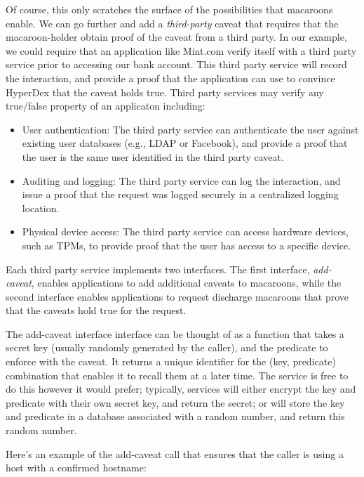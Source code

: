 Of course, this only scratches the surface of the possibilities that macaroons
enable.  We can go further and add a {\em third-party} caveat that requires that
the macaroon-holder obtain proof of the caveat from a third party.  In our
example, we could require that an application like Mint.com verify itself with a
third party service prior to accessing our bank account.  This third party
service will record the interaction, and provide a proof that the application
can use to convince HyperDex that the caveat holds true.  Third party services
may verify any true/false property of an applicaton including:

\begin{itemize}
    \item User authentication:  The third party service can authenticate the
        user against existing user databases (e.g., LDAP or Facebook), and
        provide a proof that the user is the same user identified in the third
        party caveat.
    \item Auditing and logging:  The third party service can log the
        interaction, and issue a proof that the request was logged securely in a
        centralized logging location.
    \item Physical device access:  The third party service can access hardware
        devices, such as TPMs, to provide proof that the user has access to a
        specific device.
\end{itemize}

Each third party service implements two interfaces.  The first interface, {\em
add-caveat}, enables applications to add additional caveats to macaroons, while
the second interface enables applications to request discharge macaroons that
prove that the caveats hold true for the request.

The add-caveat interface interface can be thought of as a function that takes a
secret key (usually randomly generated by the caller), and the predicate to
enforce with the caveat.  It returns a unique identifier for the (key,
predicate) combination that enables it to recall them at a later time.  The
service is free to do this however it would prefer; typically, services will
either encrypt the key and predicate with their own secret key, and return the
secret; or will store the key and predicate in a database associated with a
random number, and return this random number.

Here's an example of the add-caveat call that ensures that the caller is using a
host with a confirmed hostname:

